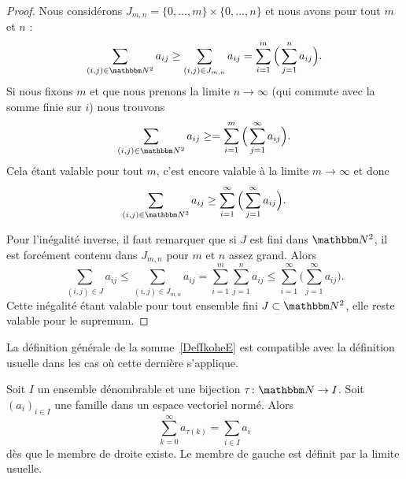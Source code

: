 \begin{proof}
    Nous considérons \( J_{m,n}=\{ 0,\ldots, m \}\times \{ 0,\ldots, n \}\) et nous avons pour tout \( m\) et \( n\) :
    \begin{equation}
        \sum_{(i,j)\in \eN^2}a_{ij}\geq \sum_{(i,j)\in J_{m,n}}a_{ij}=\sum_{i=1}^m\Big( \sum_{j=1}^na_{ij} \Big).
    \end{equation}
    Si nous fixons \( m\) et que nous prenons la limite \( n\to \infty\) (qui commute avec la somme finie sur \( i\)) nous trouvons
    \begin{equation}
        \sum_{(i,j)\in \eN^2}a_{ij}\geq =\sum_{i=1}^m\Big( \sum_{j=1}^{\infty}a_{ij} \Big).
    \end{equation}
    Cela étant valable pour tout \( m\), c'est encore valable à la limite \( m\to \infty\) et donc
    \begin{equation}
        \sum_{(i,j)\in \eN^2}a_{ij}\geq \sum_{i=1}^{\infty}\Big( \sum_{j=1}^{\infty}a_{ij} \Big).
    \end{equation}

    Pour l'inégalité inverse, il faut remarquer que si \( J\) est fini dans \( \eN^2\), il est forcément contenu dans \( J_{m,n}\) pour \( m\) et \( n\) assez grand. Alors
    \begin{equation}
        \sum_{(i,j)\in J}a_{ij}\leq \sum_{(i,j)\in J_{m,n}}a_{ij}=\sum_{i=1}^m\sum_{j=1}^na_{ij}\leq \sum_{i=1}^{\infty}\Big( \sum_{j=1}^{\infty}a_{ij} \Big).
    \end{equation}
    Cette inégalité étant valable pour tout ensemble fini \( J\subset \eN^2\), elle reste valable pour le supremum.
\end{proof}

La définition générale de la somme~\ref{DefIkoheE} est compatible avec la définition usuelle dans les cas où cette dernière s'applique.
\begin{proposition}\label{PropoWHdjw}
    Soit \( I\) un ensemble dénombrable et une bijection \( \tau\colon \eN\to I\). Soit \( (a_i)_{i\in I}\) une famille dans un espace vectoriel normé. Alors
    \begin{equation}
        \sum_{k=0}^{\infty}a_{\tau(k)}=\sum_{i\in I}a_i
    \end{equation}
    dès que le membre de droite existe. Le membre de gauche est définit par la limite usuelle.
\end{proposition}

